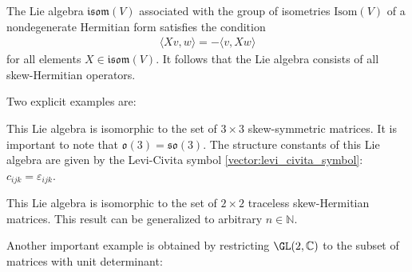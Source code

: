     \begin{example}[Isometries]
        The Lie algebra $\mathfrak{isom}(V)$ associated with the group of isometries $\mathrm{Isom}(V)$ of a nondegenerate Hermitian form satisfies the condition
        \begin{gather}
            \label{lie:lie_isometry}
            \langle Xv,w \rangle = -\langle v,Xw \rangle
        \end{gather}
        for all elements $X\in\mathfrak{isom}(V)$. It follows that the Lie algebra consists of all skew-Hermitian operators.
    \end{example}
    Two explicit examples are:
    \begin{example}\label{lie:so3}
        This Lie algebra is isomorphic to the set of $3\times3$ skew-symmetric matrices. It is important to note that $\mathfrak{o}(3)=\mathfrak{so}(3)$. The structure constants of this Lie algebra are given by the Levi-Civita symbol \ref{vector:levi_civita_symbol}: $c_{ijk}=\varepsilon_{ijk}$.
    \end{example}
    \begin{example}
        This Lie algebra is isomorphic to the set of $2\times2$ traceless skew-Hermitian matrices. This result can be generalized to arbitrary $n\in\mathbb{N}$.
    \end{example}
    Another important example is obtained by restricting $\GL(2,\mathbb{C})$ to the subset of matrices with unit determinant:
